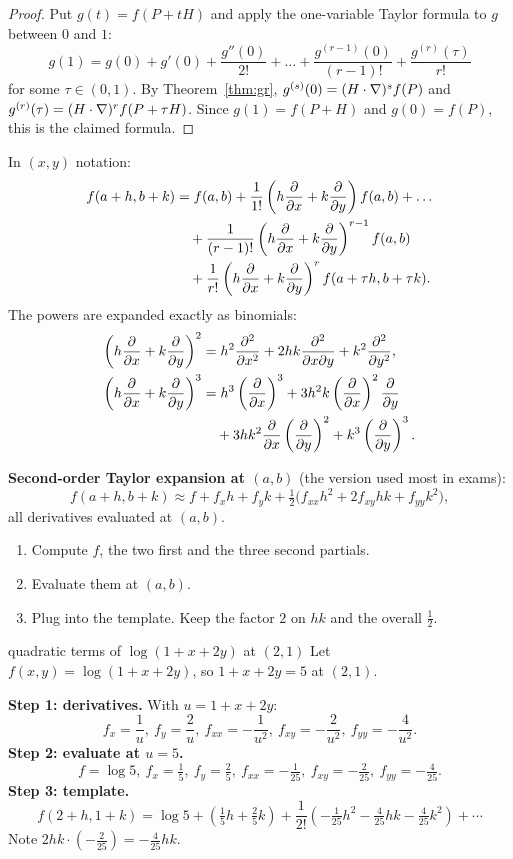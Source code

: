 \begin{proof}
Put $g(t)=f(P+tH)$ and apply the one-variable Taylor formula to $g$ between $0$ and $1$:
\[ g(1)=g(0)+g'(0)+\frac{g''(0)}{2!}+\dots+\frac{g^{(r-1)}(0)}{(r-1)!}+\frac{g^{(r)}(\tau)}{r!} \]
for some $\tau\in(0,1)$. By Theorem~\ref{thm:gr}, $g^{(s)}(0)=(H\cdot\nabla)^sf(P)$ and
$g^{(r)}(\tau)=(H\cdot\nabla)^rf(P+\tau H)$. Since $g(1)=f(P+H)$ and $g(0)=f(P)$, this is the
claimed formula.
\end{proof}

In $(x,y)$ notation:
\begin{align*}
f(a+h,b+k)&=f(a,b)+\frac{1}{1!}\left(h\frac{\partial }{\partial x}+k\frac{\partial }{\partial y}\right)f(a,b)+\dots\\
&\quad+\frac{1}{(r-1)!}\left(h\frac{\partial }{\partial x}+k\frac{\partial }{\partial y}\right)^{r-1}f(a,b)\\
&\quad+\frac{1}{r!}\left(h\frac{\partial }{\partial x}+k\frac{\partial }{\partial y}\right)^rf(a+\tau h,b+\tau k).
\end{align*}
The powers are expanded exactly as binomials:
\begin{align*}
\left(h\frac{\partial }{\partial x}+k\frac{\partial }{\partial y}\right)^2&=h^2\frac{\partial^2 }{\partial x^2}+2hk\frac{\partial^2}{\partial x\partial y}+k^2\frac{\partial^2 }{\partial y^2},\\
\left(h\frac{\partial }{\partial x}+k\frac{\partial }{\partial y}\right)^3&=h^3\left(\frac{\partial }{\partial x}\right)^3+3h^2k\left(\frac{\partial }{\partial x}\right)^2\frac{\partial }{\partial y}\\
&\quad+3hk^2\frac{\partial }{\partial x}\left(\frac{\partial }{\partial y}\right)^2+k^3\left(\frac{\partial }{\partial y}\right)^3 .
\end{align*}

\begin{recipe}
\textbf{Second-order Taylor expansion at $(a,b)$} (the version used most in exams):
\[
f(a+h,b+k)\approx f+f_xh+f_yk+\tfrac12\big(f_{xx}h^2+2f_{xy}hk+f_{yy}k^2\big),
\]
all derivatives evaluated at $(a,b)$.
\begin{enumerate}
  \item Compute $f$, the two first and the three second partials.
  \item Evaluate them at $(a,b)$.
  \item Plug into the template. Keep the factor $2$ on $hk$ and the overall $\tfrac12$.
\end{enumerate}
\end{recipe}

\begin{example}{quadratic terms of $\log(1+x+2y)$ at $(2,1)$}
Let $f(x,y)=\log(1+x+2y)$, so $1+x+2y=5$ at $(2,1)$.

\textbf{Step 1: derivatives.} With $u=1+x+2y$:
\[ f_x=\frac1u,\ f_y=\frac2u,\ f_{xx}=-\frac1{u^2},\ f_{xy}=-\frac2{u^2},\ f_{yy}=-\frac4{u^2}. \]
\textbf{Step 2: evaluate at $u=5$.}
\[ f=\log5,\ f_x=\tfrac15,\ f_y=\tfrac25,\ f_{xx}=-\tfrac1{25},\ f_{xy}=-\tfrac2{25},\ f_{yy}=-\tfrac4{25}. \]
\textbf{Step 3: template.}
\[
f(2+h,1+k)=\log5+\left(\tfrac15h+\tfrac25k\right)+\frac1{2!}\left(-\tfrac1{25}h^2-\tfrac4{25}hk-\tfrac4{25}k^2\right)+\cdots
\]
Note $2hk\cdot\left(-\tfrac2{25}\right)=-\tfrac4{25}hk$.
\end{example}


